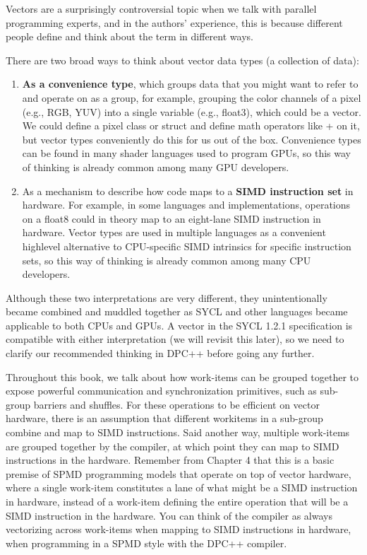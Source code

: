 Vectors are a surprisingly controversial topic when we talk with parallel programming experts, and in the authors’ experience, this is because different people define and think about the term in different ways.\par

There are two broad ways to think about vector data types (a collection of data):\par

\begin{enumerate}
	\item \textbf{As a convenience type}, which groups data that you might want to refer to and operate on as a group, for example, grouping the color channels of a pixel (e.g., RGB, YUV) into a single variable (e.g., float3), which could be a vector. We could define a pixel class or struct and define math operators like + on it, but vector types conveniently do this for us out of the box. Convenience types can be found in many shader languages used to program GPUs, so this way of thinking is already common among many GPU developers.
	\item As a mechanism to describe how code maps to a \textbf{SIMD instruction set} in hardware. For example, in some languages and implementations, operations on a float8 could in theory map to an eight-lane SIMD instruction in hardware. Vector types are used in multiple languages as a convenient highlevel alternative to CPU-specific SIMD intrinsics for specific instruction sets, so this way of thinking is already common among many CPU developers.
\end{enumerate}

Although these two interpretations are very different, they unintentionally became combined and muddled together as SYCL and other languages became applicable to both CPUs and GPUs. A vector in the SYCL 1.2.1 specification is compatible with either interpretation (we will revisit this later), so we need to clarify our recommended thinking in DPC++ before going any further.\par

Throughout this book, we talk about how work-items can be grouped together to expose powerful communication and synchronization primitives, such as sub-group barriers and shuffles. For these operations to be efficient on vector hardware, there is an assumption that different workitems in a sub-group combine and map to SIMD instructions. Said another way, multiple work-items are grouped together by the compiler, at which point they can map to SIMD instructions in the hardware. Remember from Chapter 4 that this is a basic premise of SPMD programming models that operate on top of vector hardware, where a single work-item constitutes a lane of what might be a SIMD instruction in hardware, instead of a work-item defining the entire operation that will be a SIMD instruction in the hardware. You can think of the compiler as always vectorizing across work-items when mapping to SIMD instructions in hardware, when programming in a SPMD style with the DPC++ compiler.\par

